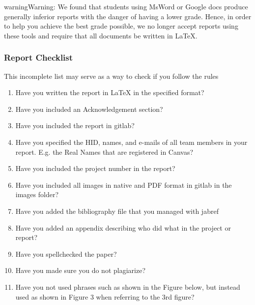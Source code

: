 \begin{sphinxadmonition}{warning}{Warning:}
We found that students using MsWord or Google docs
produce generally inferior reports with the danger of
having a lower grade. Hence, in order to help you achieve
the best grade possible, we no longer accept reports
using these tools and require that all documents be
written in LaTeX.
\end{sphinxadmonition}


\subsubsection{Report Checklist}
\label{\detokenize{lesson/doc/report:report-checklist}}
This incomplete list may serve as a way to check if you follow the rules
\begin{enumerate}
\item {} 
Have you written the report in LaTeX in the specified format?

\item {} 
Have you included an Acknowledgement section?

\item {} 
Have you included the report in gitlab?

\item {} 
Have you specified the HID, names, and e-mails of all team members in
your report. E.g. the Real Names that are registered in Canvas?

\item {} 
Have you included the project number in the report?

\item {} 
Have you included all images in native and PDF format in gitlab in
the images folder?

\item {} 
Have you added the bibliography file that you managed with jabref

\item {} 
Have you added an appendix describing who did what in the project
or report?

\item {} 
Have you spellchecked the paper?

\item {} 
Have you made sure you do not plagiarize?

\item {} 
Have you not used phrases such as shown in the Figure below, but
instead used as shown in Figure 3 when referring to the 3rd
figure?


\end{enumerate}
